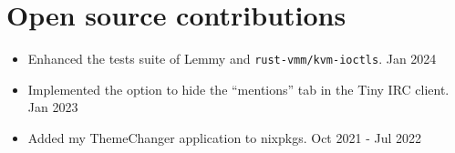 \documentclass[a4paper,12pt]{article}
\begin{document}

\section{Open source contributions}
\begin{itemize}[nosep,after=\strut, leftmargin=1em, itemsep=3pt]
    \item Enhanced the tests suite of Lemmy and \verb|rust-vmm/kvm-ioctls|. \hfill \faCalendar* Jan 2024
    \item Implemented the option to hide the ``mentions'' tab in the Tiny IRC client. \hfill \faCalendar* Jan 2023
    \item Added my ThemeChanger application to nixpkgs. \hfill \faCalendar* Oct 2021 - Jul 2022
\end{itemize}


\end{document}

